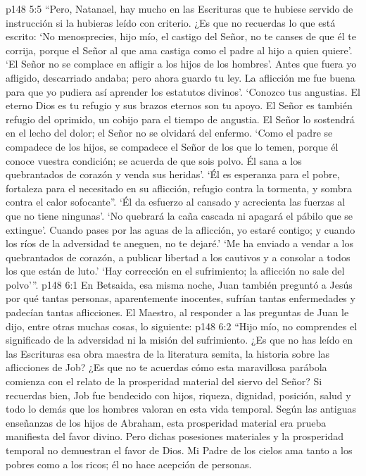 \vs p148 5:5 “Pero, Natanael, hay mucho en las Escrituras que te hubiese servido de instrucción si la hubieras leído con criterio. ¿Es que no recuerdas lo que está escrito: ‘No menosprecies, hijo mío, el castigo del Señor, no te canses de que él te corrija, porque el Señor al que ama castiga como el padre al hijo a quien quiere’. ‘El Señor no se complace en afligir a los hijos de los hombres’. Antes que fuera yo afligido, descarriado andaba; pero ahora guardo tu ley. La aflicción me fue buena para que yo pudiera así aprender los estatutos divinos’. ‘Conozco tus angustias. El eterno Dios es tu refugio y sus brazos eternos son tu apoyo. El Señor es también refugio del oprimido, un cobijo para el tiempo de angustia. El Señor lo sostendrá en el lecho del dolor; el Señor no se olvidará del enfermo. ‘Como el padre se compadece de los hijos, se compadece el Señor de los que lo temen, porque él conoce vuestra condición; se acuerda de que sois polvo. Él sana a los quebrantados de corazón y venda sus heridas’. ‘Él es esperanza para el pobre, fortaleza para el necesitado en su aflicción, refugio contra la tormenta, y sombra contra el calor sofocante”. ‘Él da esfuerzo al cansado y acrecienta las fuerzas al que no tiene ningunas’. ‘No quebrará la caña cascada ni apagará el pábilo que se extingue’. Cuando pases por las aguas de la aflicción, yo estaré contigo; y cuando los ríos de la adversidad te aneguen, no te dejaré.’ ‘Me ha enviado a vendar a los quebrantados de corazón, a publicar libertad a los cautivos y a consolar a todos los que están de luto.’ ‘Hay corrección en el sufrimiento; la aflicción no sale del polvo’”.
\vs p148 6:1 En Betsaida, esa misma noche, Juan también preguntó a Jesús por qué tantas personas, aparentemente inocentes, sufrían tantas enfermedades y padecían tantas aflicciones. El Maestro, al responder a las preguntas de Juan le dijo, entre otras muchas cosas, lo siguiente:
\vs p148 6:2 \pc “Hijo mío, no comprendes el significado de la adversidad ni la misión del sufrimiento. ¿Es que no has leído en las Escrituras esa obra maestra de la literatura semita, la historia sobre las aflicciones de Job? ¿Es que no te acuerdas cómo esta maravillosa parábola comienza con el relato de la prosperidad material del siervo del Señor? Si recuerdas bien, Job fue bendecido con hijos, riqueza, dignidad, posición, salud y todo lo demás que los hombres valoran en esta vida temporal. Según las antiguas enseñanzas de los hijos de Abraham, esta prosperidad material era prueba manifiesta del favor divino. Pero dichas posesiones materiales y la prosperidad temporal no demuestran el favor de Dios. Mi Padre de los cielos ama tanto a los pobres como a los ricos; él no hace acepción de personas.
